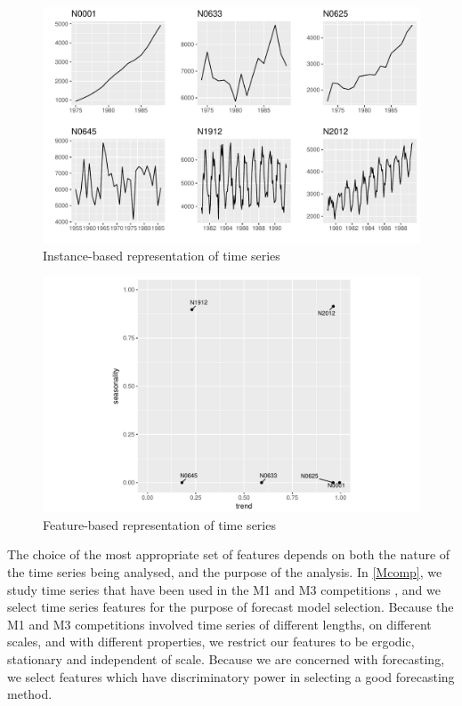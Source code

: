 \documentclass[11pt,a4paper,]{article}
\theoremstyle{definition}
\theoremstyle{definition}
\theoremstyle{definition}
\theoremstyle{remark}
\begin{document}
\begin{figure}

{\centering \includegraphics[width=\textwidth]{figure/fig1-1} 

}

\caption{Instance-based representation of time series}\label{fig:fig1}
\end{figure}

\begin{figure}

{\centering \includegraphics[width=0.7\linewidth]{figure/fig2-1} 

}

\caption{Feature-based representation of time series}\label{fig:fig2}
\end{figure}

The choice of the most appropriate set of features depends on both the
nature of the time series being analysed, and the purpose of the
analysis. In \autoref{Mcomp}, we study time series that have been used
in the M1 and M3 competitions
\autocites{makridakis1982accuracy}{makridakis2000m3}, and we select time
series features for the purpose of forecast model selection. Because the
M1 and M3 competitions involved time series of different lengths, on
different scales, and with different properties, we restrict our
features to be ergodic, stationary and independent of scale. Because we
are concerned with forecasting, we select features which have
discriminatory power in selecting a good forecasting method.
\end{document}
